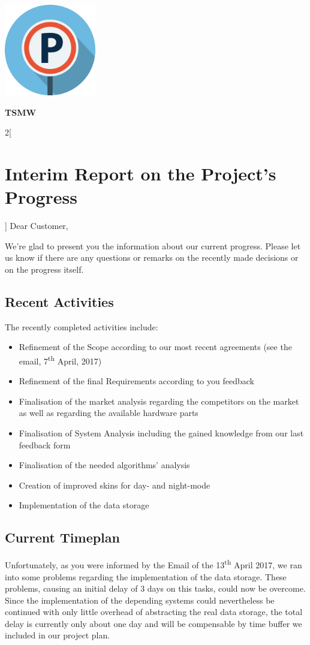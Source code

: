 \documentclass[12pt, a4paper, oneside, british]{report}
\begin{document}
\begin{center}
\includegraphics[width=0.3\textwidth]{logo.png}

\vspace{0.5cm}

{\Large
\textbf{TSMW}}
\end{center}

\begin{multicols}{2}[\section{Interim Report on the Project's Progress}]
Dear Customer,

We’re glad to present you the information about our current progress. Please let us know if there are any questions or remarks on the recently made decisions or on the progress itself.

\subsection{Recent Activities}
The recently completed activities include:
\begin{itemize}
\item Refinement of the Scope according to our most recent agreements (see the email, 7\textsuperscript{th} April, 2017)
\item Refinement of the final Requirements according to you feedback
\item Finalisation of the market analysis regarding the competitors on the market as well as regarding the available hardware parts
\item Finalisation of System Analysis including the gained knowledge from our last feedback form
\item Finalisation of the needed algorithms' analysis
\item Creation of improved skins for day- and night-mode
\item Implementation of the data storage 
\end{itemize}

\subsection{Current Timeplan}
Unfortunately, as you were informed by the Email of the 13\textsuperscript{th} April 2017, we ran into some problems regarding the implementation of the data storage. These problems, causing an initial delay of 3 days on this tasks, could now be overcome. Since the implementation of the depending systems could nevertheless be continued with only little overhead of abstracting the real data storage, the total delay is currently only about one day and will be compensable by time buffer we included in our project plan.


\end{multicols}
\end{document}
